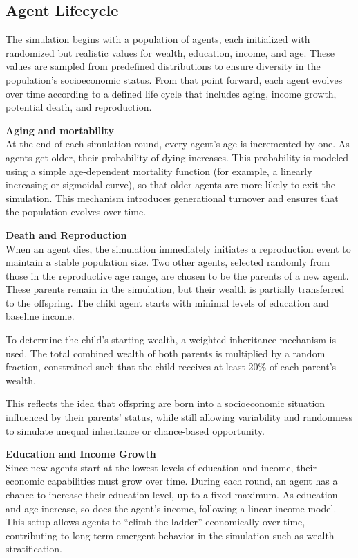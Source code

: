 \documentclass[english]{projectreport}
\begin{document}
\subsection{Agent Lifecycle}

The simulation begins with a population of agents, each initialized with randomized but realistic values for wealth, education, income, and age. These values are sampled from predefined distributions to ensure diversity in the population’s socioeconomic status. From that point forward, each agent evolves over time according to a defined life cycle that includes aging, income growth, potential death, and reproduction.

\textbf{Aging and mortability} \\
At the end of each simulation round, every agent’s age is incremented by one. As agents get older, their probability of dying increases. This probability is modeled using a simple age-dependent mortality function (for example, a linearly increasing or sigmoidal curve), so that older agents are more likely to exit the simulation. This mechanism introduces generational turnover and ensures that the population evolves over time.

\textbf{Death and Reproduction} \\
When an agent dies, the simulation immediately initiates a reproduction event to maintain a stable population size. Two other agents, selected randomly from those in the reproductive age range, are chosen to be the parents of a new agent. These parents remain in the simulation, but their wealth is partially transferred to the offspring. The child agent starts with minimal levels of education and baseline income.

To determine the child’s starting wealth, a weighted inheritance mechanism is used. The total combined wealth of both parents is multiplied by a random fraction, constrained such that the child receives at least 20\% of each parent’s wealth.

This reflects the idea that offspring are born into a socioeconomic situation influenced by their parents’ status, while still allowing variability and randomness to simulate unequal inheritance or chance-based opportunity.

\textbf{Education and Income Growth} \\
Since new agents start at the lowest levels of education and income, their economic capabilities must grow over time. During each round, an agent has a chance to increase their education level, up to a fixed maximum. As education and age increase, so does the agent’s income, following a linear income model. This setup allows agents to “climb the ladder” economically over time, contributing to long-term emergent behavior in the simulation such as wealth stratification.
\end{document}
